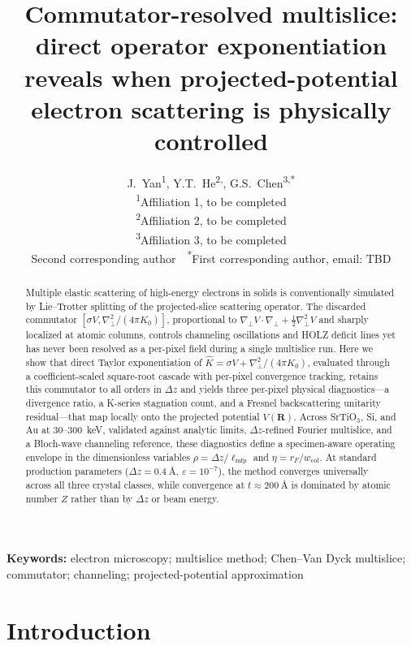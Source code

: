 \documentclass[twoside,11pt]{article}
\title{
  \vspace{-1.5cm}
  \textbf{Commutator-resolved multislice: direct operator exponentiation\\
  reveals when projected-potential electron scattering is physically controlled}
}
\author{
  J.~Yan\textsuperscript{1},
  Y.T.~He\textsuperscript{2,{\dag}},
  G.S.~Chen\textsuperscript{3,*}
  \\
  \small\textsuperscript{1}Affiliation 1, to be completed \\
  \small\textsuperscript{2}Affiliation 2, to be completed \\
  \small\textsuperscript{3}Affiliation 3, to be completed \\
  \small\textsuperscript{\dag}Second corresponding author~~\textsuperscript{*}First corresponding author, email: TBD
}
\date{}
\begin{document}
\maketitle
\thispagestyle{empty}

\begin{abstract}
Multiple elastic scattering of high-energy electrons in solids is conventionally simulated by Lie--Trotter splitting of the projected-slice scattering operator. The discarded commutator $[\sigma V,\nabla_\perp^2/(4\pi K_0)]$, proportional to $\nabla_\perp V\!\cdot\!\nabla_\perp+\tfrac12\nabla_\perp^2 V$ and sharply localized at atomic columns, controls channeling oscillations and HOLZ deficit lines yet has never been resolved as a per-pixel field during a single multislice run. Here we show that direct Taylor exponentiation of $\hat{K}=\sigma V+\nabla_\perp^2/(4\pi K_0)$, evaluated through a coefficient-scaled square-root cascade with per-pixel convergence tracking, retains this commutator to all orders in $\Delta z$ and yields three per-pixel physical diagnostics---a divergence ratio, a K-series stagnation count, and a Fresnel backscattering unitarity residual---that map locally onto the projected potential $V(\mathbf{R})$. Across SrTiO$_3$, Si, and Au at 30--300~keV, validated against analytic limits, $\Delta z$-refined Fourier multislice, and a Bloch-wave channeling reference, these diagnostics define a specimen-aware operating envelope in the dimensionless variables $\rho=\Delta z/\ell_\text{mfp}$ and $\eta=r_F/w_\text{col}$. At standard production parameters ($\Delta z=\SI{0.4}{\angstrom}$, $\varepsilon=10^{-7}$), the method converges universally across all three crystal classes, while convergence at $t\approx\SI{200}{\angstrom}$ is dominated by atomic number $Z$ rather than by $\Delta z$ or beam energy.
\end{abstract}

\vspace{0.5cm}
\noindent\textbf{Keywords:} electron microscopy; multislice method; Chen--Van Dyck multislice; commutator; channeling; projected-potential approximation

\newpage

\section{Introduction}
\setcounter{page}{1}
\end{document}
